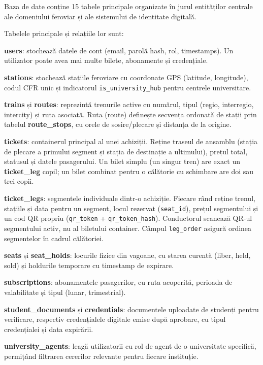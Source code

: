 \documentclass[12pt,a4paper]{report}
\begin{document}
Baza de date conține 15 tabele principale organizate în jurul entităților centrale ale domeniului feroviar și ale sistemului de identitate digitală.

Tabelele principale și relațiile lor sunt:

\textbf{users}: stochează datele de cont (email, parolă hash, rol, timestamps). Un utilizator poate avea mai multe bilete, abonamente și credențiale.

\textbf{stations}: stochează stațiile feroviare cu coordonate GPS (latitude, longitude), codul CFR unic și indicatorul \texttt{is\_university\_hub} pentru centrele universitare.

\textbf{trains} și \textbf{routes}: reprezintă trenurile active cu numărul, tipul (regio, interregio, intercity) și ruta asociată. Ruta (route) definește secvența ordonată de stații prin tabelul \textbf{route\_stops}, cu orele de sosire/plecare și distanța de la origine.

\textbf{tickets}: containerul principal al unei achiziții. Reține traseul de ansamblu (stația de plecare a primului segment și stația de destinație a ultimului), prețul total, statusul și datele pasagerului. Un bilet simplu (un singur tren) are exact un \textbf{ticket\_leg} copil; un bilet combinat pentru o călătorie cu schimbare are doi sau trei copii.

\textbf{ticket\_legs}: segmentele individuale dintr-o achiziție. Fiecare rând reține trenul, stațiile și data pentru un segment, locul rezervat (\texttt{seat\_id}), prețul segmentului și un cod QR propriu (\texttt{qr\_token} + \texttt{qr\_token\_hash}). Conductorul scanează QR-ul segmentului activ, nu al biletului container. Câmpul \texttt{leg\_order} asigură ordinea segmentelor în cadrul călătoriei.

\textbf{seats} și \textbf{seat\_holds}: locurile fizice din vagoane, cu starea curentă (liber, held, sold) și holdurile temporare cu timestamp de expirare.

\textbf{subscriptions}: abonamentele pasagerilor, cu ruta acoperită, perioada de valabilitate și tipul (lunar, trimestrial).

\textbf{student\_documents} și \textbf{credentials}: documentele uploadate de studenți pentru verificare, respectiv credențialele digitale emise după aprobare, cu tipul credențialei și data expirării.

\textbf{university\_agents}: leagă utilizatorii cu rol de agent de o universitate specifică, permițând filtrarea cererilor relevante pentru fiecare instituție.
\end{document}
